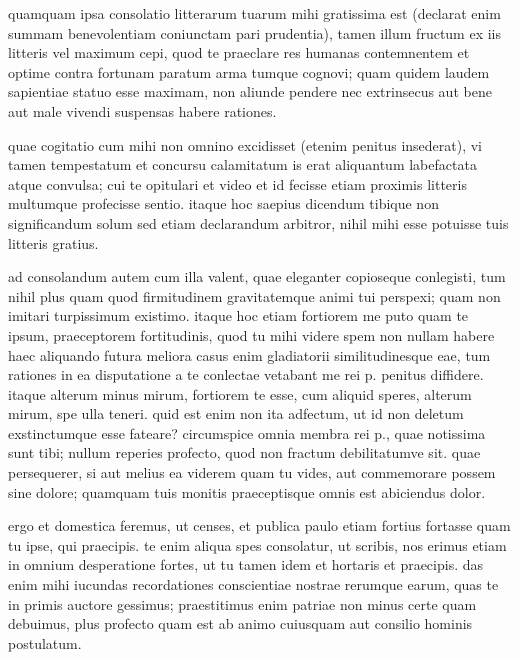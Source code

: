


 quamquam ipsa consolatio litterarum tuarum mihi gratissima est (declarat enim summam benevolentiam coniunctam pari prudentia), tamen illum fructum ex iis litteris vel maximum cepi, quod te praeclare res humanas contemnentem et optime contra fortunam paratum arma tumque cognovi; quam quidem laudem sapientiae statuo esse maximam, non aliunde pendere nec extrinsecus aut bene aut male vivendi suspensas habere rationes.

 quae cogitatio cum mihi non omnino excidisset (etenim penitus insederat), vi tamen tempestatum et concursu calamitatum is erat aliquantum labefactata atque convulsa; cui te opitulari et video et id fecisse etiam proximis litteris multumque profecisse sentio. itaque hoc saepius dicendum tibique non significandum solum sed etiam declarandum arbitror, nihil mihi esse potuisse tuis litteris gratius.

 ad consolandum autem cum illa valent, quae eleganter copioseque conlegisti, tum nihil plus quam quod firmitudinem gravitatemque animi tui perspexi; quam non imitari turpissimum existimo. itaque hoc etiam fortiorem me puto quam te ipsum, praeceptorem fortitudinis, quod tu mihi videre spem non nullam habere haec aliquando futura meliora casus enim gladiatorii similitudinesque eae, tum rationes in ea disputatione a te conlectae vetabant me rei p. penitus diffidere. itaque alterum minus mirum, fortiorem te esse, cum aliquid speres, alterum mirum, spe ulla teneri. quid est enim non ita adfectum, ut id non deletum exstinctumque esse fateare? circumspice omnia membra rei p., quae notissima sunt tibi; nullum reperies profecto, quod non fractum debilitatumve sit. quae persequerer, si aut melius ea viderem quam tu vides, aut commemorare possem sine dolore; quamquam tuis monitis praeceptisque omnis est abiciendus dolor.

 ergo et domestica feremus, ut censes, et publica paulo etiam fortius fortasse quam tu ipse, qui praecipis. te enim aliqua spes consolatur, ut scribis, nos erimus etiam in omnium desperatione fortes, ut tu tamen idem et hortaris et praecipis. das enim mihi iucundas recordationes conscientiae nostrae rerumque earum, quas te in primis auctore gessimus; praestitimus enim patriae non minus certe quam debuimus, plus profecto quam est ab animo cuiusquam aut consilio hominis postulatum.

